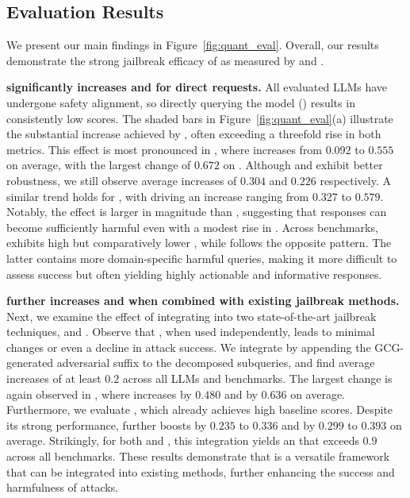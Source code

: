 \vspace{-2.25mm}
\subsection{Evaluation Results}
\label{sec:evaluation_results}
\vspace{-1.25mm}
We present our main findings in Figure~\ref{fig:quant_eval}. 
Overall, our results demonstrate the strong jailbreak efficacy of \speakeasy as measured by \asr and \harmscore.

\textbf{\speakeasy significantly increases \asr and \harmscore for direct requests.} 
All evaluated LLMs have undergone safety alignment, so directly querying the model (\dr) results in consistently low scores. 
The shaded bars in Figure~\ref{fig:quant_eval}(a) illustrate the substantial increase achieved by \speakeasy, often exceeding a threefold rise in both metrics.
This effect is most pronounced in \gptfouro, where \asr increases from $0.092$ to $0.555$ on average, with the largest change of $0.672$ on \advbench. 
Although \qwenabbr and \llamaseventyabbr exhibit better robustness, we still observe average \asr increases of $0.304$ and $0.226$ respectively. 
A similar trend holds for \harmscore, with \speakeasy driving an increase ranging from $0.327$ to $0.579$.
Notably, the effect is larger in magnitude than \asr, suggesting that responses can become sufficiently harmful even with a modest rise in \asr.
Across benchmarks, \advbench exhibits high \asr but comparatively lower \harmscore, while \medsafety follows the opposite pattern. 
The latter contains more domain-specific harmful queries, making it more difficult to assess success but often yielding highly actionable and informative responses.

\textbf{\speakeasy further increases \asr and \harmscore when combined with existing jailbreak methods.} 
Next, we examine the effect of integrating \speakeasy into two state-of-the-art jailbreak techniques, \gcg and \tap. 
Observe that \gcg, when used independently, leads to minimal changes or even a decline in attack success. 
We integrate \speakeasy by appending the GCG-generated adversarial suffix to the decomposed subqueries, and find average increases of at least $0.2$ across all LLMs and benchmarks.
The largest change is again observed in \gptfouro, where \asr increases by $0.480$ and \harmscore by $0.636$ on average. 
Furthermore, we evaluate \tap, which already achieves high baseline scores. 
Despite its strong performance, \speakeasy further boosts \asr by $0.235$ to $0.336$ and \harmscore by $0.299$ to $0.393$ on average. 
Strikingly, for both \gptfouro and \llamaseventyabbr, this integration yields an \asr that exceeds $0.9$ across all benchmarks. 
These results demonstrate that \speakeasy is a versatile framework that can be integrated into existing methods, further enhancing the success and harmfulness of attacks. 

